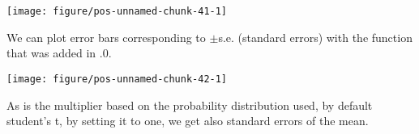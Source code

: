 \documentclass[paper=a4,10pt,div=17,headsepline,BCOR=12mm,twoside,open=right]{scrbook}\usepackage{knitr}
\begin{document}
\begin{knitrout}\footnotesize
{}\color{fgcolor}\begin{kframe}
\begin{alltt}
 \hlopt{+} \hlstd{(} \hlstd{=} \hlstd{,}
                     \hlstd{=} \hlstd{(} \hlstd{=} \hlstd{),}
                     \hlstd{=} \hlstd{,}  \hlstd{=} \hlstd{,}  \hlstd{=} \hlstd{)}
\end{alltt}
\end{kframe}

{\centering \texttt{[image: figure/pos-unnamed-chunk-41-1]} 

}



\end{knitrout}

We can plot error bars corresponding to $\pm$s.e. (standard errors) with the function  that was added in .0.

\begin{knitrout}\footnotesize
{}\color{fgcolor}\begin{kframe}
\begin{alltt}
 \hlopt{+} \hlstd{(} \hlstd{=} \hlstd{,}
                    \hlstd{=}\hlstd{,} \hlstd{=}\hlstd{,} \hlstd{=}\hlstd{)}
\end{alltt}
\end{kframe}

{\centering \texttt{[image: figure/pos-unnamed-chunk-42-1]} 

}



\end{knitrout}

As  is the multiplier based on the probability distribution used, by default student's {t}, by setting it to one, we get also standard errors of the mean.
\end{document}
